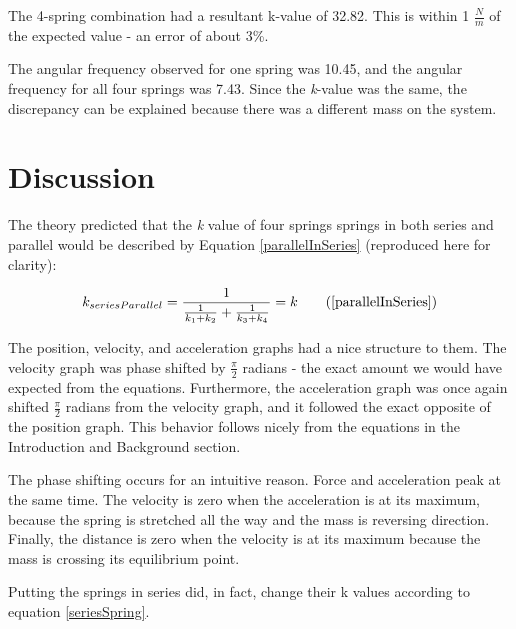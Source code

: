 \documentclass[]{article}
\begin{document}
	The 4-spring combination had a resultant k-value of 32.82. This is within 1 \textit{$\frac{N}{m}$} of the expected value - an error of about 3\%.
	
	The angular frequency observed for one spring was 10.45, and the angular frequency for all four springs was 7.43. Since the \textit{k}-value was the same, the discrepancy can be explained because there was a different mass on the system.
	
	\section{Discussion}
	The theory predicted that the \textit{k} value of four springs springs in both series and parallel would be described by Equation \ref{parallelInSeries} (reproduced here for clarity):
	
	\begin{equation*}
	k_{seriesParallel}=\frac{1}{\frac{1}{k_1+k_2} + \frac{1}{k_3+k_4}} = k \tag{\ref{parallelInSeries}}
	\end{equation*}
	
	The position, velocity, and acceleration graphs had a nice structure to them. The velocity graph was phase shifted by $ \frac{\pi}{2} $ radians - the exact amount we would have expected from the equations. Furthermore, the acceleration graph was once again shifted $\frac{\pi}{2} $ radians from the velocity graph, and it followed the exact opposite of the position graph. This behavior follows nicely from the equations in the Introduction and Background section.
	
	The phase shifting occurs for an intuitive reason. Force and acceleration peak at the same time. The velocity is zero when the acceleration is at its maximum, because the spring is stretched all the way and the mass is reversing direction. Finally, the distance is zero when the velocity is at its maximum because the mass is crossing its equilibrium point.
	
	Putting the springs in series did, in fact, change their k values according to equation \ref{seriesSpring}.
	
\end{document}
